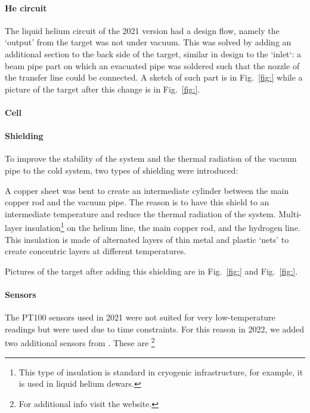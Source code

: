 \begin{refsection}
        \paragraph{He circuit} The liquid helium circuit of the 2021 version had a  design flow, namely the `output' from the target was not under vacuum.
        This was solved by adding an additional section to the back side of the target, similar in design to the `inlet`: a beam pipe part on which an evacuated pipe was soldered such that the nozzle of the transfer line could be connected.
        A sketch of such part is in Fig.~\ref{fig:} while a picture of the target after this change is in Fig.~\ref{fig:}.
        
        \paragraph{Cell}

        
        \paragraph{Shielding} To improve the stability of the system and the thermal radiation of the vacuum pipe to the cold system, two types of shielding were introduced:
        \begin{outline}
            \1 A copper sheet was bent to create an intermediate cylinder between the main copper rod and the vacuum pipe. The reason is to have this shield to an intermediate temperature and reduce the thermal radiation of the system. 
            \1 Multi-layer insulation\footnote{This type of insulation is standard in cryogenic infrastructure, for example, it is used in liquid helium dewars.} on the helium line, the main copper rod, and the hydrogen line. This insulation is made of alternated layers of thin metal and plastic `nets' to create concentric layers at different temperatures. 
        \end{outline}
        Pictures of the target after adding this shielding are in Fig.~\ref{fig:} and Fig.~\ref{fig:}. 

        \paragraph{Sensors} The PT100 sensors used in 2021 were not suited for very low-temperature readings but were used due to time constraints. 
        For this reason in 2022, we added two additional sensors from  \lakeshore.
        These are \footnote{For additional info visit the \href{https://www.lakeshore.com/products/categories/overview/temperature-products/cryogenic-temperature-sensors/germanium}{\underline{\lakeshore}} website.} 
        

\end{refsection}
